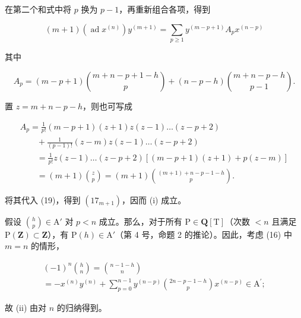 在第二个和式中将 \(p\) 换为 \(p - 1\)，再重新组合各项，得到

\[
(m + 1) (\operatorname{ad} x ^ {(n)}) y ^ {(m + 1)} = \sum_ {p \geq 1} y ^ {(m - p + 1)} A _ {p} x ^ {(n - p)}\tag{19}
\]

其中

\[
A _ {p} = (m - p + 1) \binom{m + n - p + 1 - h}{p} + (n - p - h) \binom{m + n - p - h}{p - 1}.
\]

置 \(z = m + n - p - h\)，则也可写成

\[
\begin{array}{l} A _ {p} = \frac {1}{p !} (m - p + 1) (z + 1) z (z - 1) \dots (z - p + 2) \\ \qquad + \frac {1}{(p - 1) !} (z - m) z (z - 1) \dots (z - p + 2) \\ \qquad = \frac {1}{p !} z (z - 1) \dots (z - p + 2) [ (m - p + 1) (z + 1) + p (z - m) ] \\ \qquad = (m + 1) \binom {z} {p} = (m + 1) \binom {(m + 1) + n - p - 1 - h} {p}. \end{array}
\]

将其代入 (19)，得到 \((17_{m + 1})\)，因而 (i) 成立。

假设 \(\binom{h}{p} \in \mathrm{A}'\) 对 \(p < n\) 成立。那么，对于所有 \(\mathrm{P} \in \mathbf{Q}[\mathrm{T}]\)（次数 \(< n\) 且满足 \(\mathrm{P}(\mathbf{Z}) \subset \mathbf{Z}\)），有 \(\mathrm{P}(h) \in \mathrm{A}'\)（第 4 号，命题 2 的推论）。因此，考虑 (16) 中 \(m = n\) 的情形，

\[
\begin{array}{c} (- 1) ^ {n} \binom{h}{n} = \binom{n - 1 - h}{n} \\ = - x ^ {(n)} y ^ {(n)} + \sum_ {p = 0} ^ {n - 1} y ^ {(n - p)} \binom{2 n - p - 1 - h}{p} x ^ {(n - p)} \in \mathrm{A} ^ {\prime}; \end{array}
\]

故 (ii) 由对 \(n\) 的归纳得到。

